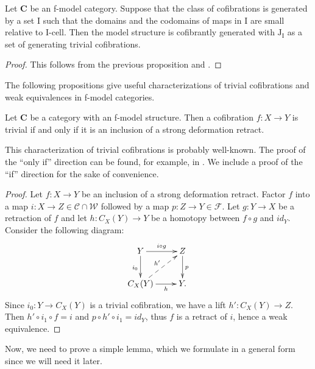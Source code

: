 \documentclass{amsart}
\theoremstyle{definition}
\newcommand{\we}{\mathcal{W}}
\newcommand{\fib}{\mathcal{F}}
\newcommand{\cof}{\mathcal{C}}
\newcommand{\cat}[1]{\mathbf{#1}}
\newcommand{\C}{\cat{C}}
\newcommand{\I}{\mathrm{I}}
\newcommand{\J}{\mathrm{J}}
\newcommand{\class}[2]{#1\text{-}\mathrm{#2}}
\newcommand{\Icell}[1][\I]{\class{#1}{cell}}
\newcommand{\cyli}{i}
\begin{document}
\begin{cor}
Let $\C$ be an f-model category.
Suppose that the class of cofibrations is generated by a set $\I$ such that
the domains and the codomains of maps in $\I$ are small relative to $\Icell$.
Then the model structure is cofibrantly generated with $\J_\I$ as a set of generating trivial cofibrations.
\end{cor}
\begin{proof}
This follows from the previous proposition and .
\end{proof}

The following propositions give useful characterizations of trivial
cofibrations and weak equivalences in f-model categories.

\begin{prop}
Let $\C$ be a category with an f-model structure.
Then a cofibration $f : X \to Y$ is trivial if and only if it is an inclusion of a strong deformation retract.
\end{prop}

This characterization of trivial cofibrations is probably well-known.
The proof of the ``only if'' direction can be found, for example, in \cite{hirschhorn}.
We include a proof of the ``if'' direction for the sake of convenience.

\begin{proof}
Let $f : X \to Y$ be an inclusion of a strong deformation retract.
Factor $f$ into a map $i : X \to Z \in \cof \cap \we$ followed by a map $p : Z \to Y \in \fib$.
Let $g : Y \to X$ be a retraction of $f$ and let $h : C_X(Y) \to Y$ be a homotopy between $f \circ g$ and $id_Y$.
Consider the following diagram:
\[ \xymatrix{ Y \ar[r]^{i \circ g} \ar[d]_{\cyli_0} & Z \ar[d]^p \\
              C_X(Y) \ar[r]_-h \ar@{-->}[ur]^{h'}   & Y.
            } \]
Since $\cyli_0 : Y \to C_X(Y)$ is a trivial cofibration, we have a lift $h' : C_X(Y) \to Z$.
Then $h' \circ \cyli_1 \circ f = i$ and $p \circ h' \circ \cyli_1 = id_Y$, thus $f$ is a retract of $i$, hence a weak equivalence.
\end{proof}

Now, we need to prove a simple lemma, which we formulate in a general form since we will need it later.
\end{document}
